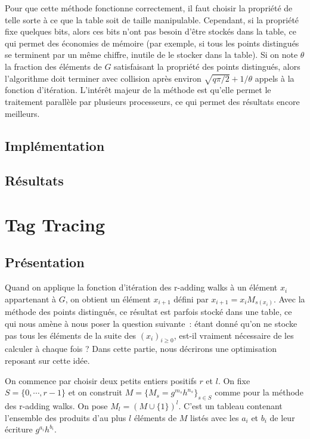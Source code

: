       Pour que cette méthode fonctionne correctement, il faut choisir la propriété de telle sorte à ce que la table soit de taille manipulable. Cependant, si la propriété fixe quelques bits, alors ces bits n'ont pas besoin d'être stockés dans la table, ce qui permet des économies de mémoire (par exemple, si tous les points distingués se terminent par un même chiffre, inutile de le stocker dans la table). Si on note $\theta$ la fraction des éléments de $G$ satisfaisant la propriété des points distingués, alors l'algorithme doit terminer avec collision après environ $\sqrt{q\pi/2} + 1/\theta$ appels à la fonction d'itération. L'intérêt majeur de la méthode est qu'elle permet le traitement parallèle par plusieurs processeurs, ce qui permet des résultats encore meilleurs.

      \subsection{Implémentation}
      \subsection{Résultats}


    \section{Tag Tracing}
      \subsection{Présentation}
      Quand on applique la fonction d'itération des r-adding walks à un élément $x_i$ appartenant à $G$, on obtient un élément $x_{i+1}$ défini par $x_{i+1} = x_i M_{s(x_i)}$. Avec la méthode des points distingués, ce résultat est parfois stocké dans une table, ce qui nous amène à nous poser la question suivante~: étant donné qu'on ne stocke pas tous les éléments de la suite des $(x_i)_{i \ge 0}$, est-il vraiment nécessaire de les calculer à chaque fois ? Dans cette partie, nous décrirons une optimisation reposant sur cette idée.

      On commence par choisir deux petits entiers positifs $r$ et $l$. On fixe $S=\{0,\cdots,r-1\}$ et on construit $M=\{M_s = g^{m_s} h^{n_s}\}_{s \in S}$ comme pour la méthode des r-adding walks. On pose $M_l = (M\cup\{1\})^l$. C'est un tableau contenant l'ensemble des produits d'au plus $l$ éléments de $M$ listés avec les $a_i$ et $b_i$ de leur écriture $g^{a_i} h^{b_i}$.

